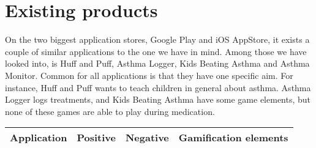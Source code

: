 \section{Existing products}
\label{exisiting-products}

On the two biggest application stores, Google Play and iOS AppStore, it exists a couple of similar applications to the one we have in mind. Among those we have looked into, is Huff and Puff, Asthma Logger, Kids Beating Asthma and Asthma Monitor. Common for all applications is that they have one specific aim. For instance, Huff and Puff wants to teach children in general about asthma. Asthma Logger logs treatments, and Kids Beating Asthma have some game elements, but none of these games are able to play during medication. 

\begin{center}
	\begin{tabular}{ | p{2.5cm} | p{5cm} | p{5cm} | p{2cm}|}
	\hline
	Application & Positive & Negative & Gamification elements \\ \hline
	

\end{tabular}
\end{center}
